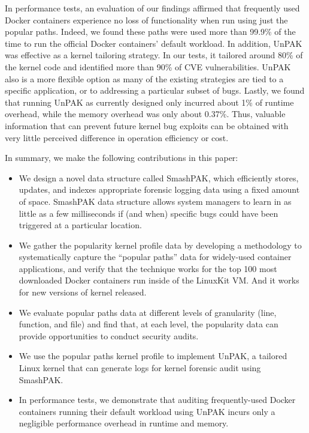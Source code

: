 In performance tests, an evaluation of our findings affirmed that frequently used Docker containers experience no loss of functionality when run using just the popular paths. 
Indeed, we found these paths were used more than 99.9\% of the time to run the official Docker containers’ default workload. In addition, 
UnPAK was effective as a kernel tailoring strategy. In our tests, it tailored around 80\% of the kernel code and identified more than 90\% of CVE vulnerabilities. 
UnPAK also is a more flexible option as many of the existing strategies are tied to a specific application, or to addressing a particular subset of bugs. 
Lastly, we found that running UnPAK as currently designed only incurred about 1\% of runtime overhead, while the memory overhead was only about 0.37\%. 
Thus, valuable information that can prevent future kernel bug exploits can be obtained with very little perceived difference in operation efficiency or cost.

In summary, we make the following contributions in this paper:
\begin{itemize}
	\item We design a novel data structure called SmashPAK, which efficiently stores, updates, and indexes appropriate forensic logging data using a fixed amount of space. SmashPAK data structure allows system managers to learn in as little as a few milliseconds if (and when) specific bugs could have been triggered at a particular location. 
	\item We gather the popularity kernel profile data by developing a methodology to systematically capture the “popular paths” data for widely-used container applications, and verify that the technique works for the top 100 most downloaded Docker containers run inside of the LinuxKit VM. And it works for new versions of kernel released.
	\item We evaluate popular paths data at different levels of granularity (line, function, and file) and find that, at each level, the popularity data can provide opportunities to conduct security audits. 
	\item We use the popular paths kernel profile to implement UnPAK, a  tailored  Linux kernel that can generate logs for kernel forensic audit using SmashPAK. 
	\item In performance tests, we demonstrate that auditing frequently-used Docker containers running their default workload using UnPAK incurs only a negligible performance overhead in runtime and memory. 
\end{itemize}